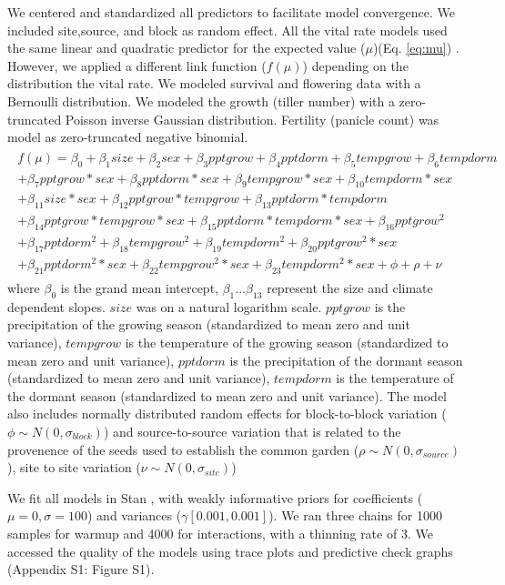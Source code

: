 \documentclass[11pt]{article}\usepackage[]{graphicx}\usepackage[usenames,dvipsnames]{xcolor}
\begin{document}
We centered and standardized all predictors to facilitate model convergence.
We included site,source, and block as random effect.
All the vital rate models used the same linear and quadratic predictor for the expected value ($\mu$)(Eq. \ref{eq:mu}) . 
However, we applied a different link function ($f(\mu)$) depending on the distribution the vital rate. 
We modeled survival and flowering data with a Bernoulli distribution.
We modeled the growth (tiller number) with a zero-truncated Poisson inverse Gaussian distribution. 
Fertility (panicle count) was model as zero-truncated negative binomial. 
\begin{align}\label{eq:mu}
\begin{split}
f(\mu) = \beta_{0} + \beta_{1}size + \beta_{2}sex + \beta_{3}pptgrow + \beta_{4}pptdorm + \beta_{5}tempgrow + \beta_{6}tempdorm \\ 
+ \beta_{7}pptgrow*sex + \beta_{8}pptdorm*sex + \beta_{9}tempgrow*sex + \beta_{10}tempdorm*sex  \\ 
+  \beta_{11}size*sex + \beta_{12}pptgrow*tempgrow + \beta_{13}pptdorm*tempdorm\\
+ \beta_{14}pptgrow*tempgrow*sex + \beta_{15}pptdorm*tempdorm*sex + \beta_{16}pptgrow^2\\
+ \beta_{17}pptdorm^2 + \beta_{18}tempgrow^2 + \beta_{19}tempdorm^2 + \beta_{20}pptgrow^2*sex  \\
+ \beta_{21}pptdorm^2*sex + \beta_{22}tempgrow^2*sex + \beta_{23}tempdorm^2*sex + \phi + \rho + \nu 
\end{split}
\end{align}
\noindent where $\beta_{0}$ is the  grand mean intercept, $\beta_{1}$...$\beta_{13}$ represent the size and climate dependent slopes.
$size$ was on a natural logarithm scale. 
$pptgrow$ is the precipitation of the growing season (standardized to mean zero and unit variance), $tempgrow$ is the temperature of the growing season (standardized to mean zero and unit variance), $pptdorm$ is the precipitation of the dormant season (standardized to mean zero and unit variance), $tempdorm$ is the temperature of the dormant season (standardized to mean zero and unit variance).
The model also includes normally distributed random effects for block-to-block variation ($\phi \sim N(0,\sigma_{block})$) and source-to-source variation that is related to the provenence of the seeds used to establish the common garden ($\rho \sim N(0,\sigma_{source})$), site to site variation ($\nu \sim N(0,\sigma_{site})$)


We fit all models in Stan \citep{rstan}, with weakly informative priors for coefficients ($\mu = 0, \sigma = 100$) and variances ($\gamma [0.001, 0.001]$). We ran three chains for 1000 samples for warmup and 4000 for interactions, with a thinning rate of 3.
We accessed the quality of the models using trace plots and predictive check graphs \citep{piironen2017comparison} (Appendix S1: Figure S1).
\end{document}
